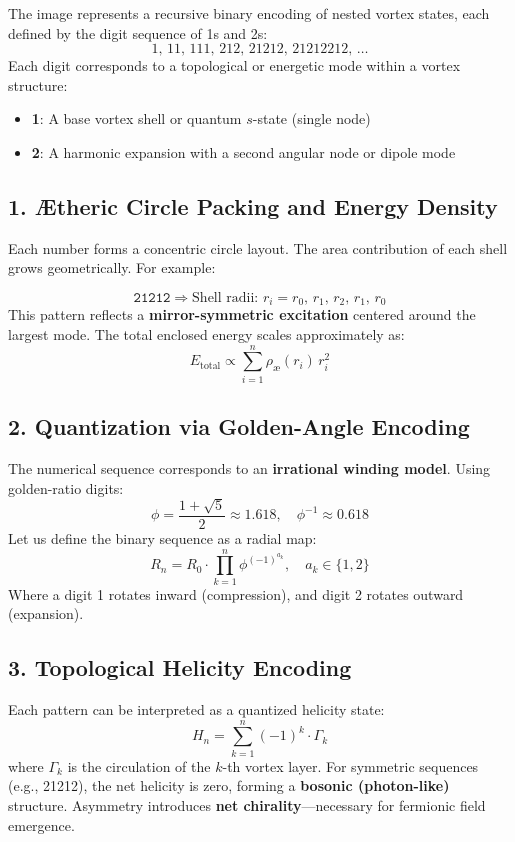 \documentclass[11pt]{article}
\begin{document}
The image represents a recursive binary encoding of nested vortex states, each defined by the digit sequence of 1s and 2s:
\[
1,\, 11,\, 111,\, 212,\, 21212,\, 21212212,\, \dots
\]
Each digit corresponds to a topological or energetic mode within a vortex structure:

\begin{itemize}
    \item \textbf{1}: A base vortex shell or quantum \( s \)-state (single node)
    \item \textbf{2}: A harmonic expansion with a second angular node or dipole mode
\end{itemize}

\subsection*{1. Ætheric Circle Packing and Energy Density}

Each number forms a concentric circle layout. The area contribution of each shell grows geometrically. For example:

\[
\texttt{21212} \Rightarrow \text{Shell radii: } r_i = r_0,\, r_1,\, r_2,\, r_1,\, r_0
\]
This pattern reflects a \textbf{mirror-symmetric excitation} centered around the largest mode. The total enclosed energy scales approximately as:
\[
E_{\text{total}} \propto \sum_{i=1}^{n} \rho_\text{\ae}(r_i)\, r_i^2
\]

\subsection*{2. Quantization via Golden-Angle Encoding}

The numerical sequence corresponds to an \textbf{irrational winding model}. Using golden-ratio digits:
\[
\phi = \frac{1 + \sqrt{5}}{2} \approx 1.618,\quad \phi^{-1} \approx 0.618
\]
Let us define the binary sequence as a radial map:
\[
R_n = R_0 \cdot \prod_{k=1}^n \phi^{(-1)^{a_k}}, \quad a_k \in \{1,2\}
\]
Where a digit 1 rotates inward (compression), and digit 2 rotates outward (expansion).

\subsection*{3. Topological Helicity Encoding}

Each pattern can be interpreted as a quantized helicity state:
\[
H_n = \sum_{k=1}^n (-1)^k \cdot \Gamma_k
\]
where \( \Gamma_k \) is the circulation of the \( k \)-th vortex layer. For symmetric sequences (e.g., 21212), the net helicity is zero, forming a \textbf{bosonic (photon-like)} structure. Asymmetry introduces \textbf{net chirality}—necessary for fermionic field emergence.
\end{document}
